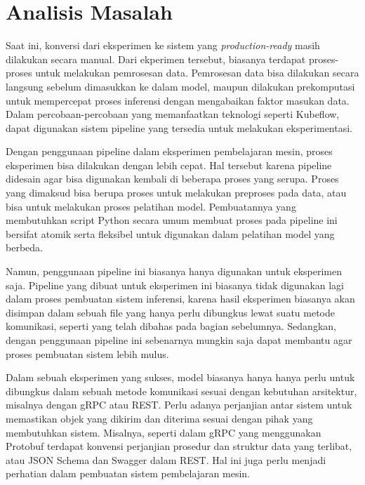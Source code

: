 \section{Analisis Masalah}

Saat ini, konversi dari eksperimen ke sistem yang \textit{production-ready} masih dilakukan secara manual.
Dari ekperimen tersebut, biasanya terdapat proses-proses untuk melakukan pemrosesan data.
Pemrosesan data bisa dilakukan secara langsung sebelum dimasukkan ke dalam model, maupun dilakukan prekomputasi untuk mempercepat proses inferensi dengan mengabaikan faktor masukan data.
Dalam percobaan-percobaan yang memanfaatkan teknologi seperti Kubeflow, dapat digunakan sistem pipeline yang tersedia untuk melakukan eksperimentasi.

Dengan penggunaan pipeline dalam eksperimen pembelajaran mesin, proses eksperimen bisa dilakukan dengan lebih cepat.
Hal tersebut karena pipeline didesain agar bisa digunakan kembali di beberapa proses yang serupa.
Proses yang dimaksud bisa berupa proses untuk melakukan preproses pada data, atau bisa untuk melakukan proses pelatihan model.
Pembuatannya yang membutuhkan script Python secara umum membuat proses pada pipeline ini bersifat atomik serta fleksibel untuk digunakan dalam pelatihan model yang berbeda.

Namun, penggunaan pipeline ini biasanya hanya digunakan untuk eksperimen saja.
Pipeline yang dibuat untuk eksperimen ini biasanya tidak digunakan lagi dalam proses pembuatan sistem inferensi, karena hasil eksperimen biasanya akan disimpan dalam sebuah file yang hanya perlu dibungkus lewat suatu metode komunikasi, seperti yang telah dibahas pada bagian sebelumnya.
Sedangkan, dengan penggunaan pipeline ini sebenarnya mungkin saja dapat membantu agar proses pembuatan sistem lebih mulus.

Dalam sebuah eksperimen yang sukses, model biasanya hanya hanya perlu untuk dibungkus dalam sebuah metode komunikasi sesuai dengan kebutuhan arsitektur, misalnya dengan gRPC atau REST.
Perlu adanya perjanjian antar sistem untuk memastikan objek yang dikirim dan diterima sesuai dengan pihak yang membutuhkan sistem.
Misalnya, seperti dalam gRPC yang menggunakan Protobuf terdapat konvensi perjanjian prosedur dan struktur data yang terlibat, atau JSON Schema dan Swagger dalam REST.
Hal ini juga perlu menjadi perhatian dalam pembuatan sistem pembelajaran mesin.
